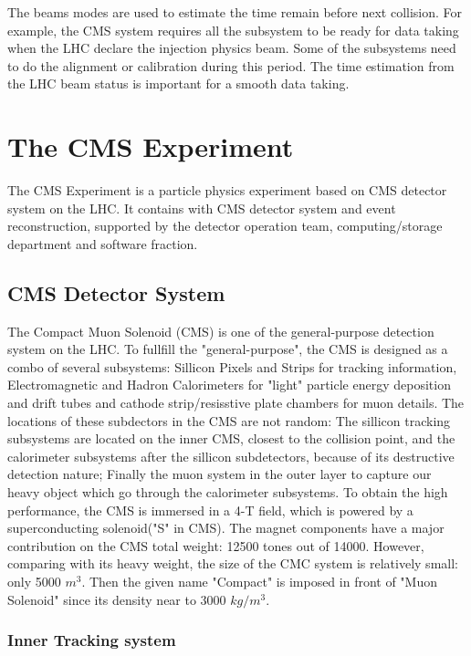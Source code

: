 The beams modes are used to estimate the time remain before next collision. For example, the CMS system requires all the subsystem to be ready for data taking when the LHC declare the injection physics beam. Some of the subsystems need to do the alignment or calibration during this period. The time estimation from the LHC beam status is important for a smooth data taking.

\clearpage
\section{The CMS Experiment}

The CMS Experiment is a particle physics experiment based on CMS detector system on the LHC. It contains with CMS detector system and event reconstruction, supported by the detector operation team, computing/storage department and software fraction.

\clearpage
\subsection{CMS Detector System}

The Compact Muon Solenoid (CMS) is one of the general-purpose detection system on the LHC. To fullfill the "general-purpose", the CMS is designed as a combo of several subsystems: Sillicon Pixels and Strips for tracking information, Electromagnetic and Hadron Calorimeters for "light" particle energy deposition and drift tubes and cathode strip/resisstive plate chambers for muon details. The locations of these subdectors in the CMS are not random: The sillicon tracking subsystems are located on the inner CMS, closest to the collision point, and the calorimeter subsystems after the sillicon subdetectors, because of its destructive detection nature; Finally the muon system in the outer layer to capture our heavy object which go through the calorimeter subsystems. To obtain the high performance, the CMS is immersed in a 4-T field, which is powered by a superconducting solenoid("S" in CMS). The magnet components have a major contribution on the CMS total weight: 12500 tones out of 14000. However, comparing with its heavy weight, the size of the CMC system is relatively small: only 5000 $m^{3}$. Then the given name "Compact" is imposed in front of "Muon Solenoid" since its density near to 3000 $kg/m^{3}$.

\subsubsection{Inner Tracking system}

